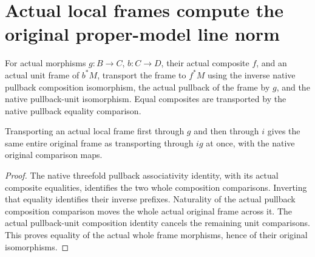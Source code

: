 \section{Actual local frames compute the original proper-model line norm}

\begin{definition}
\label{def:actual-line-frame-via-factor}
\leanok
For actual morphisms $g:B\to C$, $b:C\to D$, their actual
composite $f$, and an actual unit frame of $b^*M$, transport the
frame to $f^*M$ using the inverse native pullback composition
isomorphism, the actual pullback of the frame by $g$, and the native
pullback-unit isomorphism. Equal composites are transported by the
native pullback equality comparison.
\end{definition}

\begin{lemma}
\label{lem:actual-line-frame-via-factor-composition}
\leanok
{}
Transporting an actual local frame first through $g$ and then
through $i$ gives the same entire original frame as transporting
through $ig$ at once, with the native original comparison maps.
\end{lemma}
\begin{proof}
The native threefold pullback associativity identity, with its
actual composite equalities, identifies the two whole composition
comparisons. Inverting that equality identifies their inverse
prefixes. Naturality of the actual pullback composition comparison
moves the whole actual original frame across it. The actual
pullback-unit composition identity cancels the remaining unit
comparisons. This proves equality of the actual whole frame
morphisms, hence of their original isomorphisms.
\end{proof}

